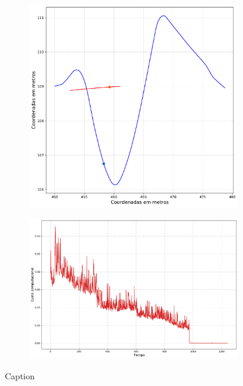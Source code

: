         \begin{figure}
    		\centering
            \begin{subfigure}{0.4\textwidth}
                \centering
                \includegraphics[width=\textwidth]{fig/chap5/headon_cpa_trajectory.pdf}
                \caption{}
                \label{fig:Kuwata2014_colregApplicable}
            \end{subfigure}
            \begin{subfigure}{0.4\textwidth}
                \centering
                \includegraphics[width=\textwidth]{fig/chap5/headon_computation_time.pdf}
                \caption{}
                \label{fig:Kuwata2014_colregNA}
            \end{subfigure}
    
            \caption{Caption}
            \label{fig:Kuwata2014_colregsInterpretation}
        \end{figure}
        
